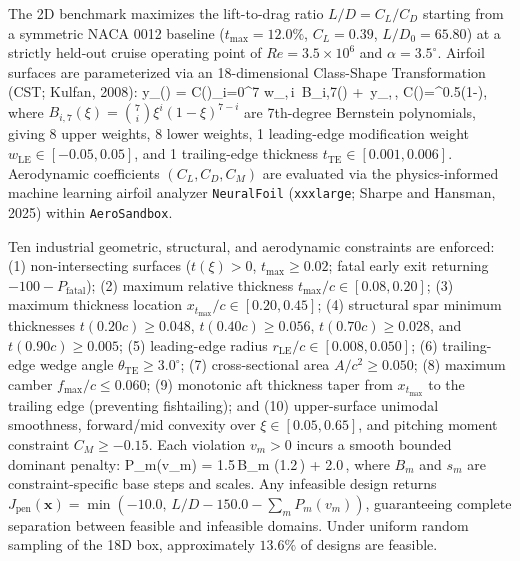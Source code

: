 \documentclass[11pt,fleqn,letterpaper]{article}
\begin{document}
The 2D benchmark maximizes the lift-to-drag ratio $L/D = C_L / C_D$ starting from a symmetric NACA 0012 baseline ($t_{\max}=12.0\%$, $C_L=0.39$, $L/D_0 = 65.80$) at a strictly held-out cruise operating point of $Re = 3.5 \times 10^6$ and $\alpha = 3.5^\circ$. Airfoil surfaces are parameterized via an 18-dimensional Class-Shape Transformation (CST; Kulfan, 2008):
\be
y_{}(\xi) = C(\xi)\sum_{i=0}^{7} w_{,\,i}\, B_{i,7}(\xi) + \xi\,\Delta y_{,\,}, \quad C(\xi)=\xi^{0.5}(1-\xi),
\label{eq:cst}
\ee
where $B_{i,7}(\xi) = \binom{7}{i}\xi^i(1-\xi)^{7-i}$ are 7th-degree Bernstein polynomials, giving 8 upper weights, 8 lower weights, 1 leading-edge modification weight $w_{\text{LE}} \in [-0.05, 0.05]$, and 1 trailing-edge thickness $t_{\text{TE}} \in [0.001, 0.006]$. Aerodynamic coefficients $(C_L, C_D, C_M)$ are evaluated via the physics-informed machine learning airfoil analyzer \texttt{NeuralFoil} (\texttt{xxxlarge}; Sharpe and Hansman, 2025) within \texttt{AeroSandbox}.

Ten industrial geometric, structural, and aerodynamic constraints are enforced: (1) non-intersecting surfaces ($t(\xi) > 0$, $t_{\max} \ge 0.02$; fatal early exit returning $-100 - P_{\text{fatal}}$); (2) maximum relative thickness $t_{\max}/c \in [0.08, 0.20]$; (3) maximum thickness location $x_{t_{\max}}/c \in [0.20, 0.45]$; (4) structural spar minimum thicknesses $t(0.20c)\ge 0.048$, $t(0.40c)\ge 0.056$, $t(0.70c)\ge 0.028$, and $t(0.90c)\ge 0.005$; (5) leading-edge radius $r_{\text{LE}}/c \in [0.008, 0.050]$; (6) trailing-edge wedge angle $\theta_{\text{TE}} \ge 3.0^\circ$; (7) cross-sectional area $A/c^2 \ge 0.050$; (8) maximum camber $f_{\max}/c \le 0.060$; (9) monotonic aft thickness taper from $x_{t_{\max}}$ to the trailing edge (preventing fishtailing); and (10) upper-surface unimodal smoothness, forward/mid convexity over $\xi \in [0.05, 0.65]$, and pitching moment constraint $C_M \ge -0.15$. Each violation $v_m > 0$ incurs a smooth bounded dominant penalty:
\be
P_m(v_m) = 1.5\,B_m \tanh\!\left(1.2\,\right) + 2.0\,,
\label{eq:penalty}
\ee
where $B_m$ and $s_m$ are constraint-specific base steps and scales. Any infeasible design returns $J_{\text{pen}}(\mathbf{x}) = \min(-10.0,\, L/D - 150.0 - \sum_m P_m(v_m))$, guaranteeing complete separation between feasible and infeasible domains. Under uniform random sampling of the 18D box, approximately $13.6\%$ of designs are feasible.
\end{document}
